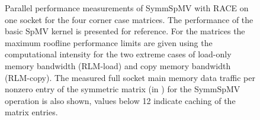 \begin{figure}[t]
	\centering
	\caption{Parallel performance measurements of \acrshort{SymmSpMV}
	with \acrshort{RACE} on one \SKX socket for the four
	corner case matrices. The performance of the
	basic \acrshort{SpMV} kernel is presented for reference. For the
	matrices 
	the maximum roof{}line performance limits  are
	given using the computational intensity  for
	the two extreme cases of load-only memory bandwidth (RLM-load) and copy
	memory bandwidth (RLM-copy). The measured full socket main memory data
	traffic per nonzero entry of the symmetric matrix (in \BYTE) for the \acrshort{SymmSpMV}
	 operation is also shown, values below 12 \BYTE indicate caching of the matrix entries.}
	\label{fig:corner_cases_scaling}
\end{figure}

